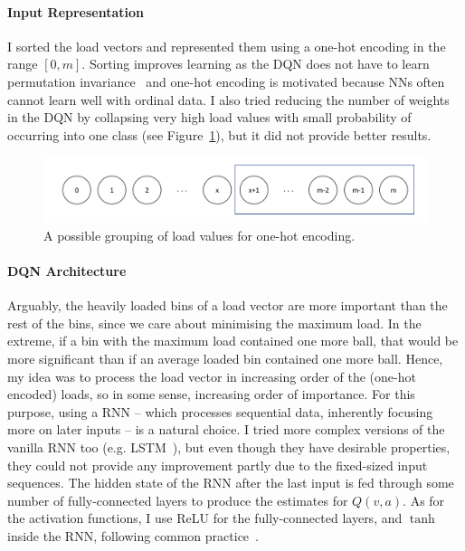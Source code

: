 \paragraph{Input Representation} I sorted the load vectors and represented them using a one-hot encoding in the range $[0, m]$. Sorting improves learning as the DQN does not have to learn permutation invariance~\cite{zaheer2017permutationinvariance} and one-hot encoding is motivated because NNs often cannot learn well with ordinal data. I also tried reducing the number of weights in the DQN by collapsing very high load values with small probability of occurring into one class (see Figure~\ref{NN-maxload}), but it did not provide better results.


\begin{figure}[ht]
    \centering
    \includegraphics[scale=0.5]{Chapter3/Figs/NN_maxload.pdf}
    \caption{A possible grouping of load values for one-hot encoding.}
    \label{NN-maxload}
\end{figure}


\paragraph{DQN Architecture} Arguably, the heavily loaded bins of a load vector are more important than the rest of the bins, since we care about minimising the maximum load. In the extreme, if a bin with the maximum load contained one more ball, that would be more significant than if an average loaded bin contained one more ball. Hence, my idea was to process the load vector in increasing order of the (one-hot encoded) loads, so in some sense, increasing order of importance. For this purpose, using a RNN -- which processes sequential data, inherently focusing more on later inputs -- is a natural choice. I tried more complex versions of the vanilla RNN too (e.g. LSTM~\cite{shewalkar2019rnngrulstm}), but even though they have desirable properties, they could not provide any improvement partly due to the fixed-sized input sequences. The hidden state of the RNN after the last input is fed through some number of fully-connected layers to produce the estimates for $Q(v, a)$. As for the activation functions, I use ReLU for the fully-connected layers, and $\tanh$ inside the RNN, following common practice~\cite{szandala2020activationfunctions}.


